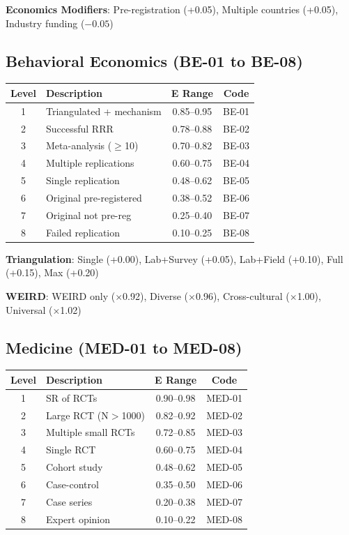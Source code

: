 \documentclass[11pt,a4paper]{article}
\begin{document}
\textbf{Economics Modifiers}: Pre-registration (+0.05), Multiple countries (+0.05), Industry funding ($-0.05$)

\subsection{Behavioral Economics (BE-01 to BE-08)}

\begin{center}
\begin{tabular}{clcc}
\toprule
\textbf{Level} & \textbf{Description} & \textbf{E Range} & \textbf{Code} \\
\midrule
1 & Triangulated + mechanism & 0.85--0.95 & BE-01 \\
2 & Successful RRR & 0.78--0.88 & BE-02 \\
3 & Meta-analysis ($\geq$10) & 0.70--0.82 & BE-03 \\
4 & Multiple replications & 0.60--0.75 & BE-04 \\
5 & Single replication & 0.48--0.62 & BE-05 \\
6 & Original pre-registered & 0.38--0.52 & BE-06 \\
7 & Original not pre-reg & 0.25--0.40 & BE-07 \\
8 & Failed replication & 0.10--0.25 & BE-08 \\
\bottomrule
\end{tabular}
\end{center}

\textbf{Triangulation}: Single (+0.00), Lab+Survey (+0.05), Lab+Field (+0.10), Full (+0.15), Max (+0.20)

\textbf{WEIRD}: WEIRD only ($\times$0.92), Diverse ($\times$0.96), Cross-cultural ($\times$1.00), Universal ($\times$1.02)

\subsection{Medicine (MED-01 to MED-08)}

\begin{center}
\begin{tabular}{clcc}
\toprule
\textbf{Level} & \textbf{Description} & \textbf{E Range} & \textbf{Code} \\
\midrule
1 & SR of RCTs & 0.90--0.98 & MED-01 \\
2 & Large RCT (N$>$1000) & 0.82--0.92 & MED-02 \\
3 & Multiple small RCTs & 0.72--0.85 & MED-03 \\
4 & Single RCT & 0.60--0.75 & MED-04 \\
5 & Cohort study & 0.48--0.62 & MED-05 \\
6 & Case-control & 0.35--0.50 & MED-06 \\
7 & Case series & 0.20--0.38 & MED-07 \\
8 & Expert opinion & 0.10--0.22 & MED-08 \\
\bottomrule
\end{tabular}
\end{center}
\end{document}
